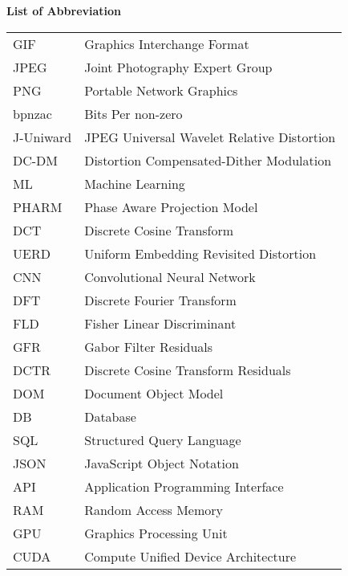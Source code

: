
\begin{flushleft}
    \Huge{\textbf{List of Abbreviation}}\vspace{1cm}\\
\end{flushleft}
\normalsize{\begin{tabular}{l l}
        GIF       & Graphics Interchange Format                \\
        JPEG      & Joint Photography Expert Group             \\
        PNG       & Portable Network Graphics                  \\
        bpnzac    & Bits Per non-zero                          \\
        J-Uniward & JPEG Universal Wavelet Relative Distortion \\
        DC-DM     & Distortion Compensated-Dither Modulation   \\
        ML        & Machine Learning                           \\
        PHARM     & Phase Aware Projection Model               \\
        DCT       & Discrete Cosine Transform                  \\
        UERD      & Uniform Embedding Revisited Distortion     \\
        CNN       & Convolutional Neural Network               \\
        DFT       & Discrete Fourier Transform\\
        FLD       & Fisher Linear Discriminant                 \\
        GFR       & Gabor Filter Residuals                     \\
        DCTR      & Discrete Cosine Transform Residuals        \\
        DOM       & Document Object Model                      \\
        DB        & Database                                   \\
        SQL       & Structured Query Language                  \\
        JSON      & JavaScript Object Notation                 \\
        API       & Application Programming Interface          \\
        RAM       & Random Access Memory                       \\
        GPU       & Graphics Processing Unit                   \\
        CUDA      & Compute Unified Device Architecture        \\
    \end{tabular}}

